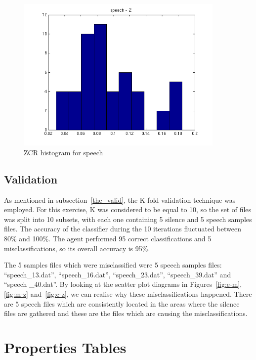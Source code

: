 \documentclass{article}
\begin{document}
\begin{figure}[h!]
  \centering
  \includegraphics[width=0.9\textwidth]{histo_sp_z}
  \caption{ZCR histogram for speech}
  \label{fig:histo_sp_z}
\end{figure} 

\subsection{Validation}

As mentioned in subsection~\ref{the_valid}, the K-fold validation technique was employed.
For this exercise, K was considered to be equal to 10, so the set of files was split into 10 subsets, with each one containing 5 silence and 5 speech samples files.
The accuracy of the classifier during the 10 iterations fluctuated between 80\% and 100\%.
The agent performed 95 correct classifications and 5 misclassifications, so its overall accuracy is 95\%. 

The 5 samples files which were misclassified were 5 speech samples files: ``speech\_13.dat'', ``speech\_16.dat'', ``speech\_23.dat'', ``speech\_39.dat'' and ``speech \_40.dat''. %
By looking at the scatter plot diagrams in Figures~\ref{fig:e-m}, \ref{fig:m-z} and~\ref{fig:e-z}, we can realise why these misclassifications happened. 
There are 5 speech files which are consistently located in the areas where the silence files are gathered and these are the files which are causing the misclassifications.

\newpage

\appendix
\appendixpage

\section{Properties Tables}
\label{prtab}
\end{document}

